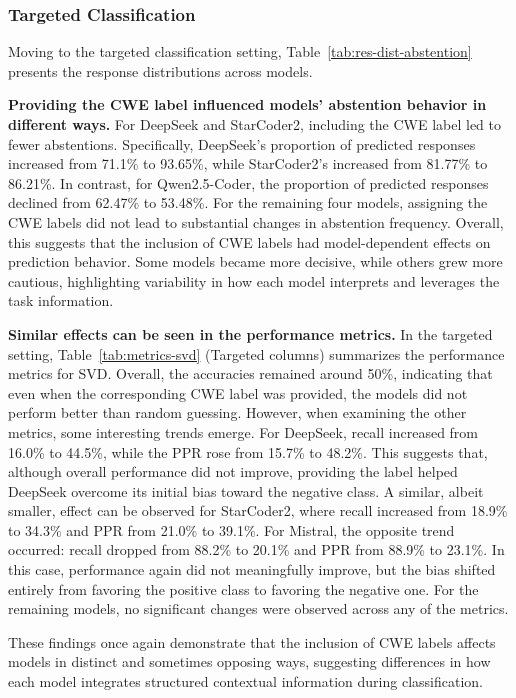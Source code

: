 \documentclass[lettersize,journal]{IEEEtran}
\begin{document}
\subsubsection{Targeted Classification}

Moving to the targeted classification setting, Table~\ref{tab:res-dist-abstention} presents the response distributions across models.

\textbf{Providing the CWE label influenced models’ abstention behavior in different ways.} For DeepSeek and StarCoder2, including the \gls{CWE} label led to fewer abstentions. Specifically, DeepSeek’s proportion of predicted responses increased from 71.1\% to 93.65\%, while StarCoder2's increased from 81.77\% to 86.21\%. In contrast, for Qwen2.5-Coder, the proportion of predicted responses declined from 62.47\% to 53.48\%. For the remaining four models, assigning the \gls{CWE} labels did not lead to substantial changes in abstention frequency. Overall, this suggests that the inclusion of \gls{CWE} labels had model-dependent effects on prediction behavior. Some models became more decisive, while others grew more cautious, highlighting variability in how each model interprets and leverages the task information.

\textbf{Similar effects can be seen in the performance metrics.} In the targeted setting, Table~\ref{tab:metrics-svd} (Targeted columns) summarizes the performance metrics for \gls{SVD}. Overall, the accuracies remained around 50\%, indicating that even when the corresponding \gls{CWE} label was provided, the models did not perform better than random guessing. However, when examining the other metrics, some interesting trends emerge. For DeepSeek, recall increased from 16.0\% to 44.5\%, while the PPR rose from 15.7\% to 48.2\%. This suggests that, although overall performance did not improve, providing the label helped DeepSeek overcome its initial bias toward the negative class. A similar, albeit smaller, effect can be observed for StarCoder2, where recall increased from 18.9\% to 34.3\% and PPR from 21.0\% to 39.1\%. For Mistral, the opposite trend occurred: recall dropped from 88.2\% to 20.1\% and PPR from 88.9\% to 23.1\%. In this case, performance again did not meaningfully improve, but the bias shifted entirely from favoring the positive class to favoring the negative one. For the remaining models, no significant changes were observed across any of the metrics.

These findings once again demonstrate that the inclusion of \gls{CWE} labels affects models in distinct and sometimes opposing ways, suggesting differences in how each model integrates structured contextual information during classification.
\end{document}
